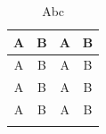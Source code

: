 \documentclass{scrartcl}
\begin{document}
\begin{table}
\centering
\renewcommand{\arraystretch}{1.5}
\end{table}

\renewcommand\arraystretch{1.5}
\begin{longtable}{c|c|c|c}
A & B & A & B \\ \hline 
A & B & A & B \\ \hline
A & B & A & B \\ \hline
A & B & A & B \\ \hline
\caption{Abc}
\end{longtable}
\end{document}
